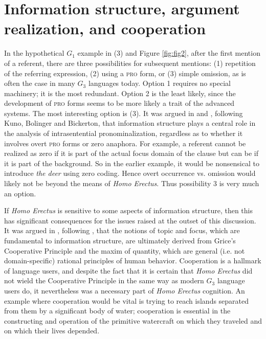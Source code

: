 \documentclass[output=paper,colorlinks,citecolor=brown]{langscibook}
\begin{document}
\section{Information structure, argument realization, and cooperation}\label{sec:vanvalin:4}

In the hypothetical $G_1$ example in (3) and Figure \ref{fig:fig2}, after the first mention of a referent, there are three possibilities for subsequent mentions: (1) repetition of the referring expression, (2) using a \textsc{pro} form, or  (3) simple omission, as is often the case in many $G_3$ languages today.  Option 1 requires no special machinery; it is the most redundant.  Option 2 is the least likely, since the development of \textsc{pro} forms seems to be more likely a trait of the advanced systems.  The most interesting option is (3).  It was argued in \citet{van1990functionalism} and \citet{van1997syntax}, following Kuno, Bolinger and Bickerton, that information structure plays a central role in the analysis of intrasentential pronominalization, regardless as to whether it involves overt \textsc{pro} forms or zero anaphora.  For example, a referent cannot be realized as zero if it is part of the actual focus 
domain of the clause but can be if it is part of the background.  So in the earlier example, it would be nonsensical to introduce \emph{the deer} using zero coding.  Hence overt occurrence vs. omission would likely not be beyond the means of \emph{Homo Erectus}.  Thus possibility 3 is very much an option.

If \emph{Homo Erectus} is sensitive to some aspects of information structure, then this has significant consequences for the issues raised at the outset of this discussion.  It was argued in \citet{van1993synopsis}, following \citet{kempson1975presupposition}, that the notions of topic and focus, which are fundamental to information structure, are ultimately derived from Grice’s Cooperative Principle and the maxim of quantity, which are general (i.e. not domain-specific) rational principles of human behavior.  Cooperation is a hallmark of language users, and despite the fact that it is certain that \emph{Homo Erectus} did not wield the Cooperative Principle in the same way as modern $G_3$ language users do, it nevertheless was a necessary part of \emph{Homo Erectus} cognition.  An example where cooperation would be vital is trying to reach islands separated from them by a significant body of water; cooperation is essential in the constructing and operation of the primitive watercraft on which they traveled and on which their lives depended.
\end{document}
